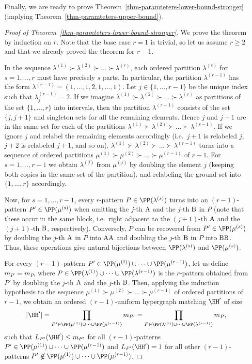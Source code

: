 Finally, we are ready to prove Theorem~\ref{thm-paramteters-lower-bound-stronger} (implying Theorem~\ref{thm-paramteters-upper-bound}).

\begin{proof}[Proof of Theorem~\ref{thm-paramteters-lower-bound-stronger}]
We prove the theorem by induction on $r$. Note that the base case $r=1$ is trivial, so let us assume $r\ge 2$ and that we already proved the theorem for $r-1$.

In the sequence $\lambda^{(1)} \succ \lambda^{(2)} \succ \dots \succ \lambda^{(r)}$, each ordered partition $\lambda^{(s)}$ for $s=1,\dots,r$ must have precisely $s$ parts. In particular, the partition $\lambda^{(r-1)}$ has the form $\lambda^{(r-1)}=(1,\dots,1,2,1,\dots,1)$. Let $j\in \{1,\dots,r-1\}$ be the unique index such that $\lambda^{(r-1)}_j=2$. If we imagine $\lambda^{(1)} \succ \lambda^{(2)} \succ \dots \succ \lambda^{(r)}$ as partitions of the set $\{1,\dots,r\}$ into intervals, then the partition  $\lambda^{(r-1)}$ consists of the set $\{j,j+1\}$ and singleton sets for all the remaining elements. Hence $j$ and $j+1$ are in the same set for each of the partitions $\lambda^{(1)} \succ \lambda^{(2)} \succ \dots \succ \lambda^{(r-1)}$. If we ignore $j$ and relabel the remaining elements accordingly (i.e.\ $j+1$ is relabeled $j$, $j+2$ is relabeled $j+1$, and so on), $\lambda^{(1)} \succ \lambda^{(2)} \succ \dots \succ \lambda^{(r-1)}$ turns into a sequence of ordered partitions $\mu^{(1)} \succ \mu^{(2)} \succ \dots \succ \mu^{(r-1)}$ of $r-1$. For $s=1,\dots,r-1$ we obtain $\lambda^{(j)}$ from $\mu^{(j)}$ by doubling the element $j$ (keeping both copies in the same set of the partition), and relabeling the ground set into $\{1,\dots,r\}$ accordingly.

Now, for $s=1,\dots,r-1$, every $r$-pattern $P\in \PP(\lambda^{(s)})$ turns into an $(r-1)$-pattern $P'\in \PP(\mu^{(s)})$ when omitting the $j$-th $\rm A$ and the $j$-th $\rm B$ in $P$ (note that these occur in the same block, i.e.\ right adjacent to the $(j+1)$-th $\rm A$ and the $(j+1)$-th $\rm B$, respectively). Conversely, $P$ can be recovered from $P'\in \PP(\mu^{(s)})$ by doubling the $j$-th $\rm A$
in $P$ into $\rm{AA}$ and doubling the $j$-th $\rm B$
in $P$ into $\rm{BB}$. Thus, these operations give natural bijections between $\PP(\lambda^{(s)})$ and $\PP(\mu^{(s)})$.

For every $(r-1)$-pattern $P'\in \PP(\mu^{(1)})\cup\dots\cup \PP(\mu^{(r-1)})$, let us define $m_{P'}=m_P$, where $P\in \PP(\lambda^{(1)})\cup\dots\cup \PP(\lambda^{(r-1)})$ is the $r$-pattern obtained from $P'$ by doubling the $j$-th $\rm A$ and the $j$-th $\rm B$. Then, applying the induction hypothesis to the sequence $\mu^{(1)} \succ \mu^{(2)} \succ \dots \succ \mu^{(r-1)}$ of ordered partitions of $r-1$, we obtain an ordered $(r-1)$-uniform hypergraph matching $\HH'$ of size
\[|\HH'|=\prod_{P'\in \PP(\mu^{(1)})\cup\dots\cup \PP(\mu^{(r-1)})} m_{P'}=\prod_{P\in \PP(\lambda^{(1)})\cup\dots\cup \PP(\lambda^{(r-1)})} m_{P},\]
such that $L_{P'}(\HH')\le m_{P'}$ for all $(r-1)$-patterns $P'\in \PP(\mu^{(1)})\cup\dots\cup \PP(\mu^{(r-1)})$ and $L_{P'}(\HH')=1$ for all other $(r-1)$-patterns $P'\not\in \PP(\mu^{(1)})\cup\dots\cup \PP(\mu^{(r-1)})$.


\end{proof}
